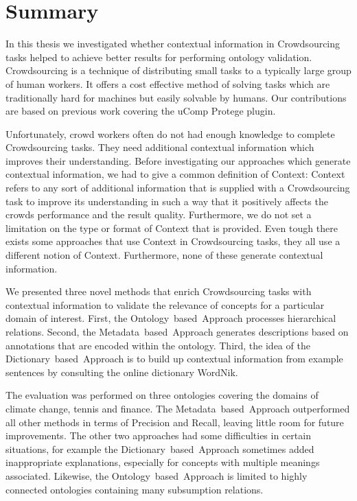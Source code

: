 


\section{Summary}\label{sec:conclusion_and_futue_work_summary}
In this thesis we investigated whether contextual information in Crowdsourcing tasks helped to achieve better results for performing ontology validation.
Crowdsourcing is a technique of distributing small tasks to a typically large group of human workers. It offers a cost effective method of solving tasks which are traditionally hard for machines but easily solvable by humans. 
Our contributions are based on previous work covering the uComp Protege plugin.

Unfortunately, crowd workers often do not had enough knowledge to complete Crowdsourcing tasks. They need additional contextual information which improves their understanding.
Before investigating our approaches which generate contextual information, we had to give a common definition of \guillemotright Context\guillemotleft: 
Context refers to any sort of additional information that is supplied with a Crowdsourcing task to improve its understanding in such a way that it positively affects the crowds performance and the result quality. Furthermore, we do not set a limitation on the type or format of Context that is provided. 
Even tough there exists some approaches that use Context in Crowdsourcing tasks, they all use a different notion of Context. Furthermore, none of these generate contextual information.

We presented three novel methods that enrich Crowdsourcing tasks with contextual information to validate the relevance of concepts for a particular domain of interest. First, the Ontology~based~Approach processes hierarchical relations. Second, the Metadata~based~Approach generates descriptions based on annotations that are encoded within the ontology. Third, the idea of the Dictionary~based~Approach is to build up contextual information from example sentences by consulting the online dictionary WordNik.

The evaluation was performed on three ontologies covering the domains of climate change, tennis and finance. The Metadata~based~Approach outperformed all other methods in terms of Precision and Recall, leaving little room for future improvements. The other two approaches had some difficulties in certain situations, for example the Dictionary~based~Approach sometimes added inappropriate explanations, especially for concepts with multiple meanings associated. Likewise, the Ontology~based~Approach is limited to highly connected ontologies containing many subsumption relations. 

